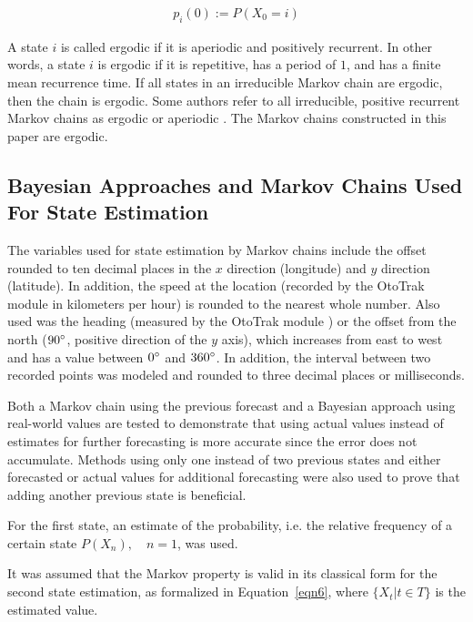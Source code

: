 \documentclass[preprint,12pt]{elsarticle}
\begin{document}
\begin{equation} \label{eqn5}
    \begin{aligned}
     p_{i}(0):=P(X_{0}=i)
    \end{aligned}
\end{equation}  

A state $i$ is called ergodic if it is aperiodic and positively recurrent. In other words, a state $i$ is ergodic if it is repetitive, has a period of $1$, and has a finite mean recurrence time. If all states in an irreducible Markov chain are ergodic, then the chain is ergodic. Some authors refer to all irreducible, positive recurrent Markov chains as ergodic or aperiodic \citep{Parzen1962-oe}. The Markov chains constructed in this paper are ergodic.

\subsection{Bayesian Approaches and Markov Chains Used For State Estimation}

The variables used for state estimation by Markov chains include the offset rounded to ten decimal places in the $x$ direction (longitude) and $y$ direction (latitude). In addition, the speed at the location (recorded by the OtoTrak module  \cite{ototrakOtoTrakTrack} in kilometers per hour) is rounded to the nearest whole number. Also used was the heading (measured by the OtoTrak module  \cite{ototrakOtoTrakTrack}) or the offset from the north ($90\degree$, positive direction of the $y$ axis), which increases from east to west and has a value between $0\degree$ and $360\degree$. In addition, the interval between two recorded points was modeled and rounded to three decimal places or milliseconds.

Both a Markov chain using the previous forecast and a Bayesian approach using real-world values are tested to demonstrate that using actual values instead of estimates for further forecasting is more accurate since the error does not accumulate. Methods using only one instead of two previous states and either forecasted or actual values for additional forecasting were also used to prove that adding another previous state is beneficial.

For the first state, an estimate of the probability, i.e. the relative frequency of a certain state $P(X_{n}), \quad n = 1$, was used.

It was assumed that the Markov property is valid in its classical form for the second state estimation, as formalized in Equation~\ref{eqn6}, where $\{X_{t}|t\in T\}$ is the estimated value.
\end{document}
